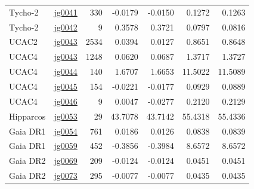 {\begin{longtable}{llrrrrr}
Tycho-2 & \href{https://www.sai.msu.ru/neb/nss/html/obspos/OBS_COLL/J/jg0041.html}{jg0041} & 330 & -0.0179 & -0.0150 & 0.1272 & 0.1263 \\
Tycho-2 & \href{https://www.sai.msu.ru/neb/nss/html/obspos/OBS_COLL/J/jg0042.html}{jg0042} & 9 & 0.3578 & 0.3721 & 0.0797 & 0.0816 \\
UCAC2 & \href{https://www.sai.msu.ru/neb/nss/html/obspos/OBS_COLL/J/jg0043.html}{jg0043} & 2534 & 0.0394 & 0.0127 & 0.8651 & 0.8648 \\
UCAC4 & \href{https://www.sai.msu.ru/neb/nss/html/obspos/OBS_COLL/J/jg0043.html}{jg0043} & 1248 & 0.0620 & 0.0687 & 1.3717 & 1.3727 \\
UCAC4 & \href{https://www.sai.msu.ru/neb/nss/html/obspos/OBS_COLL/J/jg0044.html}{jg0044} & 140 & 1.6707 & 1.6653 & 11.5022 & 11.5089 \\
UCAC4 & \href{https://www.sai.msu.ru/neb/nss/html/obspos/OBS_COLL/J/jg0045.html}{jg0045} & 154 & -0.0221 & -0.0177 & 0.0929 & 0.0889 \\
UCAC4 & \href{https://www.sai.msu.ru/neb/nss/html/obspos/OBS_COLL/J/jg0046.html}{jg0046} & 9 & 0.0047 & -0.0277 & 0.2120 & 0.2129 \\
Hipparcos & \href{https://www.sai.msu.ru/neb/nss/html/obspos/OBS_COLL/J/jg0053.html}{jg0053} & 29 & 43.7078 & 43.7142 & 55.4318 & 55.4336 \\
Gaia DR1 & \href{https://www.sai.msu.ru/neb/nss/html/obspos/OBS_COLL/J/jg0054.html}{jg0054} & 761 & 0.0186 & 0.0126 & 0.0838 & 0.0839 \\
Gaia DR1 & \href{https://www.sai.msu.ru/neb/nss/html/obspos/OBS_COLL/J/jg0059.html}{jg0059} & 452 & -0.3856 & -0.3984 & 8.6572 & 8.6572 \\
Gaia DR2 & \href{https://www.sai.msu.ru/neb/nss/html/obspos/OBS_COLL/J/jg0069.html}{jg0069} & 209 & -0.0124 & -0.0124 & 0.0451 & 0.0451 \\
Gaia DR2 & \href{https://www.sai.msu.ru/neb/nss/html/obspos/OBS_COLL/J/jg0073.html}{jg0073} & 295 & -0.0077 & -0.0077 & 0.0435 & 0.0435 \\
\end{longtable}
}
